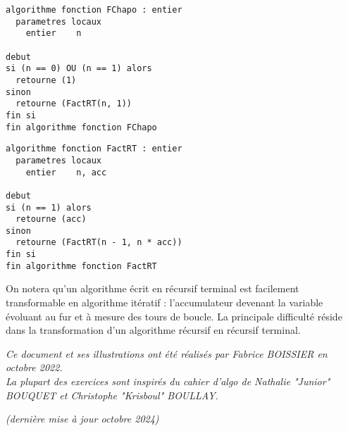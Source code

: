\documentclass[11pt,a4paper]{article}
\begin{document}
\begin{table}[!ht]
  \centering
  \begin{minipage}{0.478\textwidth}
    \centering
\begin{lstlisting}[style=algorithmique]
algorithme fonction FChapo : entier
  parametres locaux
    entier    n

debut
si (n == 0) OU (n == 1) alors
  retourne (1)
sinon
  retourne (FactRT(n, 1))
fin si
fin algorithme fonction FChapo \end{lstlisting}
  \end{minipage}
  \hfillx
  \begin{minipage}{0.48\textwidth}
    \centering
\begin{lstlisting}[style=algorithmique]
algorithme fonction FactRT : entier
  parametres locaux
    entier    n, acc

debut
si (n == 1) alors
  retourne (acc)
sinon
  retourne (FactRT(n - 1, n * acc))
fin si
fin algorithme fonction FactRT \end{lstlisting}
  \end{minipage}
\end{table}

On notera qu'un algorithme écrit en récursif terminal est facilement transformable en algorithme itératif : l'accumulateur devenant la variable évoluant au fur et à mesure des tours de boucle.
La principale difficulté réside dans la transformation d'un algorithme récursif en récursif terminal.

\bigskip



\vfillFirst

\vfillLast


\begin{center}
\textit{Ce document et ses illustrations ont été réalisés par Fabrice BOISSIER en octobre 2022.\\
La plupart des exercices sont inspirés du cahier d'algo de Nathalie "Junior" BOUQUET et Christophe "Krisboul" BOULLAY.}

\textit{(dernière mise à jour octobre 2024)}
\end{center}
\end{document}

